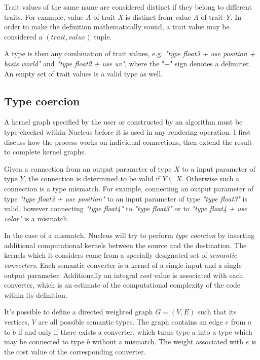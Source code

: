 Trait values of the same name are considered distinct if they belong to different traits. For example, value \emph{A} of trait \emph{X} is distinct from value \emph{A} of trait \emph{Y}. In order to make the definition mathematically sound, a trait value may be considered a $(trait, value)$ tuple.

A type is then any combination of trait values, e.g. \emph{"type float3 + use position + basis world"} and \emph{"type float2 + use uv"}, where the "+" sign denotes a delimiter. An empty set of trait values is a valid type as well.

\subsection{Type coercion}

A kernel graph specified by the user or constructed by an algorithm must be type-checked within Nucleus before it is used in any rendering operation. I first discuss how the process works on individual connections, then extend the result to complete kernel graphs.

Given a connection from an output parameter of type $X$ to a input parameter of type $Y$, the connection is determined to be valid if $Y \subseteq X$. Otherwise such a connection is a type mismatch. For example, connecting an output parameter of type \emph{"type float3 + use position"} to an input parameter of type \emph{"type float3"} is valid, however connecting \emph{"type float4"} to \emph{"type float3"} or to \emph{"type float4 + use color"} is a mismatch.

In the case of a mismatch, Nucleus will try to perform \emph{type coercion} by inserting additional computational kernels between the source and the destination. The kernels which it considers come from a specially designated set of \emph{semantic converters}. Each semantic converter is a kernel of a single input and a single output parameter. Additionally an integral \emph{cost} value is associated with each converter, which is an estimate of the computational complexity of the code within its definition.

It's possible to define a directed weighted graph $G=(V, E)$ such that its vertices, $V$ are all possible semantic types. The graph contains an edge $e$ from $a$ to $b$ if and only if there exists a converter, which turns type $a$ into a type which may be connected to type $b$ without a mismatch. The weight associated with $e$ is the cost value of the corresponding converter.

